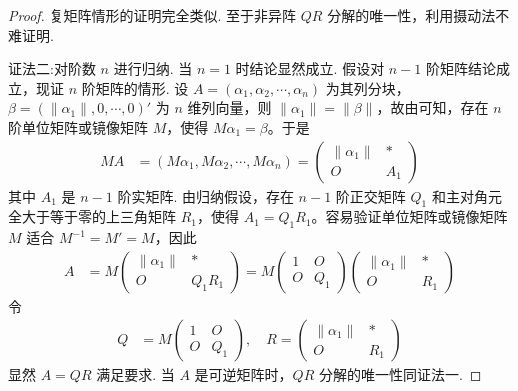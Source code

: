 \documentclass[../../main.tex]{subfiles}%
\begin{document}
\begin{proof}
复矩阵情形的证明完全类似.
至于非异阵 $QR$ 分解的唯一性，利用摄动法不难证明.

{\color{blue}证法二:}对阶数 \(n\) 进行归纳. 当 \(n = 1\) 时结论显然成立. 假设对 \(n - 1\) 阶矩阵结论成立，现证 \(n\) 阶矩阵的情形. 设 \(A = (\alpha_1,\alpha_2,\cdots,\alpha_n)\) 为其列分块，\(\beta = (\|\alpha_1\|,0,\cdots,0)'\) 为 \(n\) 维列向量，则 \(\|\alpha_1\| = \|\beta\|\)，故由可知，存在 \(n\) 阶单位矩阵或镜像矩阵 \(M\)，使得 \(M\alpha_1 = \beta\)。于是
\begin{align*}
MA &= (M\alpha_1,M\alpha_2,\cdots,M\alpha_n) = 
\begin{pmatrix}
\|\alpha_1\| & * \\
O & A_1
\end{pmatrix}
\end{align*}
其中 \(A_1\) 是 \(n - 1\) 阶实矩阵. 由归纳假设，存在 \(n - 1\) 阶正交矩阵 \(Q_1\) 和主对角元全大于等于零的上三角矩阵 \(R_1\)，使得 \(A_1 = Q_1R_1\)。容易验证单位矩阵或镜像矩阵 \(M\) 适合 \(M^{-1} = M' = M\)，因此
\begin{align*}
A &= M\begin{pmatrix}
\|\alpha_1\| & * \\
O & Q_1R_1
\end{pmatrix} = M\begin{pmatrix}
1 & O \\
O & Q_1
\end{pmatrix}\begin{pmatrix}
\|\alpha_1\| & * \\
O & R_1
\end{pmatrix}
\end{align*}
令
\begin{align*}
Q &= M\begin{pmatrix}
1 & O \\
O & Q_1
\end{pmatrix},\quad R = \begin{pmatrix}
\|\alpha_1\| & * \\
O & R_1
\end{pmatrix}
\end{align*}
显然 \(A = QR\) 满足要求. 当 \(A\) 是可逆矩阵时，\(QR\) 分解的唯一性同证法一.
\end{proof}
\end{document}

